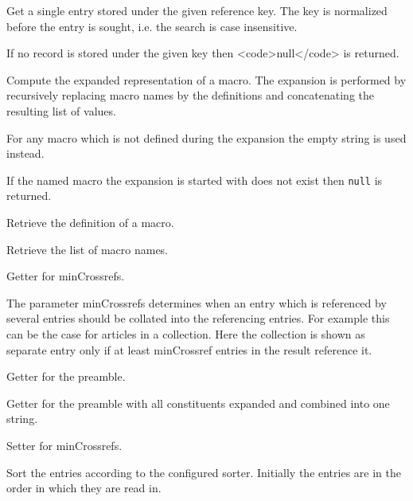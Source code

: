 \begin{methods}
    Get a single entry stored under the given reference key. The key
    is normalized before the entry is sought, i.e. the search is case
    insensitive.
    
    If no record is stored under the given key then <code>null</code>
    is returned.

    Compute the expanded representation of a macro. The expansion is
    performed by recursively replacing macro names by the definitions
    and concatenating the resulting list of values.
    
    For any macro which is not defined during the expansion the empty
    string is used instead.
    
    If the named macro the expansion is started with does not exist
    then \texttt{null} is returned.

    Retrieve the definition of a macro.

    Retrieve the list of macro names.

    Getter for minCrossrefs.
    
    The parameter minCrossrefs determines when an entry which is
    referenced by several entries should be collated into the
    referencing entries. For example this can be the case for articles
    in a collection. Here the collection is shown as separate entry
    only if at least minCrossref entries in the result reference it.

    Getter for the preamble.

    Getter for the preamble with all constituents expanded and combined into
    one string.

    Setter for minCrossrefs.

    Sort the entries according to the configured sorter.
    Initially the entries are in the order in which they are read in.

\end{methods}

